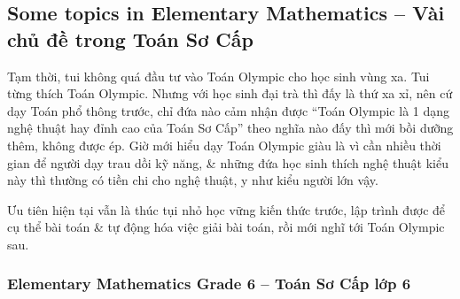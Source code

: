 \documentclass[12pt,twoside]{book}
\begin{document}
\subsection{Some topics in Elementary Mathematics -- Vài chủ đề trong Toán Sơ Cấp}
Tạm thời, tui không quá đầu tư vào Toán Olympic cho học sinh vùng xa. Tui từng thích Toán Olympic. Nhưng với học sinh đại trà thì đấy là thứ xa xỉ, nên cứ dạy Toán phổ thông trước, chỉ đứa nào cảm nhận được ``Toán Olympic là 1 dạng nghệ thuật hay đỉnh cao của Toán Sơ Cấp'' theo nghĩa nào đấy thì mới bồi dưỡng thêm, không được ép. Giờ mới hiểu dạy Toán Olympic giàu là vì cần nhiều thời gian để người dạy trau dồi kỹ năng, \& những đứa học sinh thích nghệ thuật kiểu này thì thường có tiền chi cho nghệ thuật, y như kiểu người lớn vậy.

Ưu tiên hiện tại vẫn là thúc tụi nhỏ học vững kiến thức trước, lập trình được để cụ thể bài toán \& tự động hóa việc giải bài toán, rồi mới nghĩ tới Toán Olympic sau.

\subsubsection{Elementary Mathematics Grade 6 -- Toán Sơ Cấp lớp 6}
\end{document}
